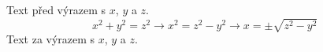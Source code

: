 \documentclass[a4paper]{article}
\begin{document}
Text před výrazem s $x$, $y$ a $z$.
$$x^2+y^2=z^2 \to x^2=z^2-y^2 \to x=\pm\sqrt{z^2-y^2}$$
Text za výrazem s $x$, $y$ a $z$.
\end{document}
